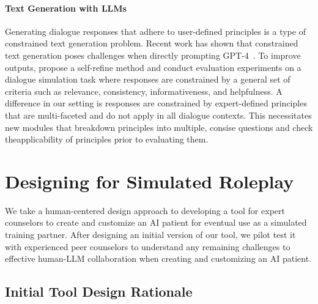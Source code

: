 \documentclass[11pt]{article}
\begin{document}
\paragraph{Text Generation with LLMs}
Generating dialogue responses that adhere to user-defined principles is a type of constrained text generation problem. Recent work has shown that constrained text generation poses challenges when directly prompting GPT-4~\cite{madaan2023selfrefine, bubeck2023sparks, yao2023collie}. To improve outputs, \citet{yao2023collie} propose a self-refine method and conduct evaluation experiments on a dialogue simulation task where responses are constrained by a general set of criteria such as relevance, consistency, informativeness, and helpfulness. A difference in our setting is responses are constrained by expert-defined principles that are multi-faceted and do not apply in all dialogue contexts. This necessitates new modules that breakdown principles into multiple, consise questions and check theapplicability of principles prior to evaluating them.
\vspace{-0.05in}
\section{Designing for Simulated Roleplay}\vspace{-0.05in}
We take a human-centered design approach to developing a
tool for expert counselors to create and customize an AI patient for eventual use as a simulated training partner. After designing an initial version of our tool, we pilot test it with experienced peer counselors to understand any remaining challenges to effective human-LLM collaboration when creating and customizing an AI patient.

\subsection{Initial Tool Design Rationale} \label{sec:initialtooldesignrationale}
\end{document}
